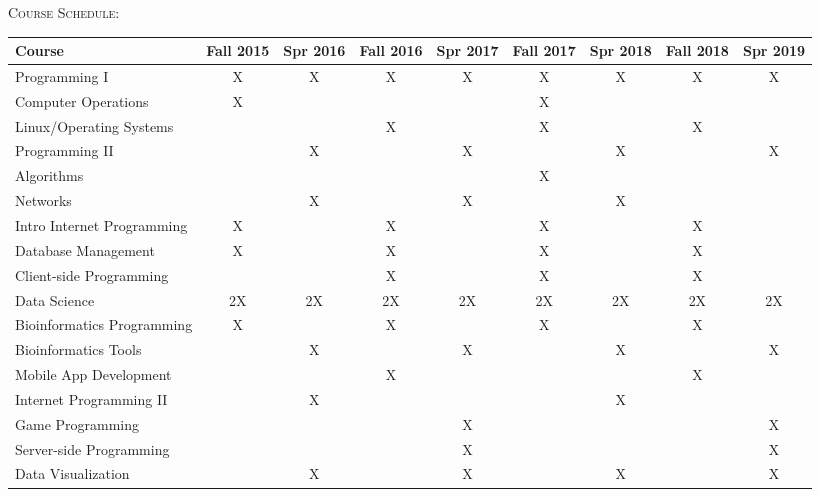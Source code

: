 \documentclass[letterpaper,10pt]{article}
\begin{document}
\begin{center}
\end{center}

\bigskip



{\scshape  \Large Course Schedule:}\\[5pt]
\setlength{\extrarowheight}{4pt}
\begin{tabular}{ l | c | c | c |c |c |c |c |c |}
Course & Fall 2015 & Spr 2016 & Fall 2016 & Spr 2017 & Fall 2017 & Spr 2018 & Fall 2018 & Spr 2019\\
\hline
\hline
Programming I             & X & X & X & X & X & X & X & X\\[2pt]
Computer Operations       & X &   &  &  & X &  &  &  \\[2pt]
Linux/Operating Systems   &  &  & X &  & X &  & X &   \\[2pt]
Programming II            &  & X &  & X & & X & & X  \\[2pt]
Algorithms                & &  & & & X &  & &  \\[2pt]
Networks                  & & X & & X & & X & &   \\[2pt]
Intro Internet Programming & X & & X & & X & & X & \\[2pt]
Database Management       & X & & X & & X &  & X &  \\[2pt]
Client-side Programming   & & & X & & X & & X &  \\[2pt]
\hline
Data Science              & 2X & 2X & 2X & 2X & 2X & 2X & 2X & 2X\\[2pt]
Bioinformatics Programming  & X & & X & & X & & X & \\[2pt]
Bioinformatics Tools      &  & X &  & X & & X & & X  \\[2pt]
Mobile App Development    &  & & X & &  & & X &  \\[2pt]
Internet Programming II   & & X & &  & & X & &  \\[2pt]
Game Programming          & & &  & X & & &  & X  \\[2pt]
Server-side Programming   & & & & X & & & & X \\[2pt]
Data Visualization        & & X & & X & & X & & X \\[2pt]
\hline
\end{tabular}
\end{document}
